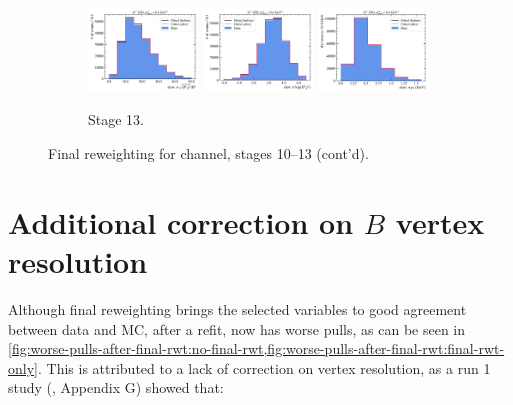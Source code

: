 \begin{figure}[htb]
    \begin{subfigure}{\textwidth}
        \centering
        \includegraphics[width=0.32\textwidth]{./figs-mc-correction/reweighting-final/plot_step12-Dst_iso-spi_comp.pdf}
        \includegraphics[width=0.32\textwidth]{./figs-mc-correction/reweighting-final/plot_step12-Dst_iso-spi_log_ip_chi2.pdf}
        \includegraphics[width=0.32\textwidth]{./figs-mc-correction/reweighting-final/plot_step12-Dst_iso-spi_pt.pdf}
        \caption{Stage 13.}
    \end{subfigure}

    \caption{Final reweighting for \Dstar channel, stages 10--13 (cont'd).}
    \label{fig:final-rwt-dst-idx3}
\end{figure}


\section{Additional correction on $B$ vertex resolution}
\label{ref:mc-cor:vertex}

Although final reweighting brings the selected variables to good agreement
between data and MC, after a refit, \mmSq now has worse pulls, as can be seen
in \cref{fig:worse-pulls-after-final-rwt:no-final-rwt,fig:worse-pulls-after-final-rwt:final-rwt-only}.
This is attributed to a lack of correction on vertex resolution,
as a run 1 study (\cite{LHCb-ANA-2020-056}, Appendix G) showed that:

